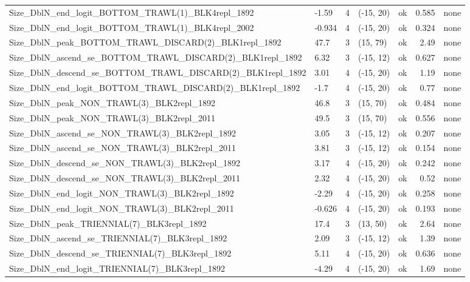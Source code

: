 \documentclass[
]{scrartcl}
\begin{document}
\begin{longtable}{llrllrl}
Size\_DblN\_end\_logit\_BOTTOM\_TRAWL(1)\_BLK4repl\_1892 & -1.59 & 4 & (-15, 20) & ok & 0.585 & none \\ 
Size\_DblN\_end\_logit\_BOTTOM\_TRAWL(1)\_BLK4repl\_2002 & -0.934 & 4 & (-15, 20) & ok & 0.324 & none \\ 
Size\_DblN\_peak\_BOTTOM\_TRAWL\_DISCARD(2)\_BLK1repl\_1892 & 47.7 & 3 & (15, 79) & ok & 2.49 & none \\ 
Size\_DblN\_ascend\_se\_BOTTOM\_TRAWL\_DISCARD(2)\_BLK1repl\_1892 & 6.32 & 3 & (-15, 12) & ok & 0.627 & none \\ 
Size\_DblN\_descend\_se\_BOTTOM\_TRAWL\_DISCARD(2)\_BLK1repl\_1892 & 3.01 & 4 & (-15, 20) & ok & 1.19 & none \\ 
Size\_DblN\_end\_logit\_BOTTOM\_TRAWL\_DISCARD(2)\_BLK1repl\_1892 & -1.7 & 4 & (-15, 20) & ok & 0.77 & none \\ 
Size\_DblN\_peak\_NON\_TRAWL(3)\_BLK2repl\_1892 & 46.8 & 3 & (15, 70) & ok & 0.484 & none \\ 
Size\_DblN\_peak\_NON\_TRAWL(3)\_BLK2repl\_2011 & 49.5 & 3 & (15, 70) & ok & 0.556 & none \\ 
Size\_DblN\_ascend\_se\_NON\_TRAWL(3)\_BLK2repl\_1892 & 3.05 & 3 & (-15, 12) & ok & 0.207 & none \\ 
Size\_DblN\_ascend\_se\_NON\_TRAWL(3)\_BLK2repl\_2011 & 3.81 & 3 & (-15, 12) & ok & 0.154 & none \\ 
Size\_DblN\_descend\_se\_NON\_TRAWL(3)\_BLK2repl\_1892 & 3.17 & 4 & (-15, 20) & ok & 0.242 & none \\ 
Size\_DblN\_descend\_se\_NON\_TRAWL(3)\_BLK2repl\_2011 & 2.32 & 4 & (-15, 20) & ok & 0.52 & none \\ 
Size\_DblN\_end\_logit\_NON\_TRAWL(3)\_BLK2repl\_1892 & -2.29 & 4 & (-15, 20) & ok & 0.258 & none \\ 
Size\_DblN\_end\_logit\_NON\_TRAWL(3)\_BLK2repl\_2011 & -0.626 & 4 & (-15, 20) & ok & 0.193 & none \\ 
Size\_DblN\_peak\_TRIENNIAL(7)\_BLK3repl\_1892 & 17.4 & 3 & (13, 50) & ok & 2.64 & none \\ 
Size\_DblN\_ascend\_se\_TRIENNIAL(7)\_BLK3repl\_1892 & 2.09 & 3 & (-15, 12) & ok & 1.39 & none \\ 
Size\_DblN\_descend\_se\_TRIENNIAL(7)\_BLK3repl\_1892 & 5.11 & 4 & (-15, 20) & ok & 0.636 & none \\ 
Size\_DblN\_end\_logit\_TRIENNIAL(7)\_BLK3repl\_1892 & -4.29 & 4 & (-15, 20) & ok & 1.69 & none \\ 
\bottomrule

\end{longtable}
\end{document}
